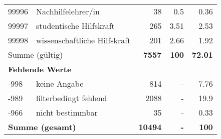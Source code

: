 \begin{longtable}{lXrrr}
        99996 & \multicolumn{1}{X}{Nachhilfelehrer/in} & %
          \num{38} &
          \num[round-mode=places,round-precision=2]{0,5} &
          \num[round-mode=places,round-precision=2]{0,36} \\

        99997 & \multicolumn{1}{X}{studentische Hilfskraft} & %
          \num{265} &
          \num[round-mode=places,round-precision=2]{3,51} &
          \num[round-mode=places,round-precision=2]{2,53} \\

        99998 & \multicolumn{1}{X}{wissenschaftliche Hilfskraft} & %
          \num{201} &
          \num[round-mode=places,round-precision=2]{2,66} &
          \num[round-mode=places,round-precision=2]{1,92} \\

     \midrule
     \multicolumn{2}{l}{Summe (gültig)} &
       \textbf{\num{7557}} &
     \textbf{100} &
       \textbf{\num[round-mode=places,round-precision=2]{72,01}} \\
     \multicolumn{5}{l}{\textbf{Fehlende Werte}}\\
       -998 &
       keine Angabe &
         \num{814} &
        - &
         \num[round-mode=places,round-precision=2]{7,76} \\
       -989 &
       filterbedingt fehlend &
         \num{2088} &
        - &
         \num[round-mode=places,round-precision=2]{19,9} \\
       -966 &
       nicht bestimmbar &
         \num{35} &
        - &
         \num[round-mode=places,round-precision=2]{0,33} \\
     \midrule
     \multicolumn{2}{l}{\textbf{Summe (gesamt)}} &
          \textbf{\num{10494}} &
        \textbf{-} &
        \textbf{100} \\
     \bottomrule
     \end{longtable}
     
